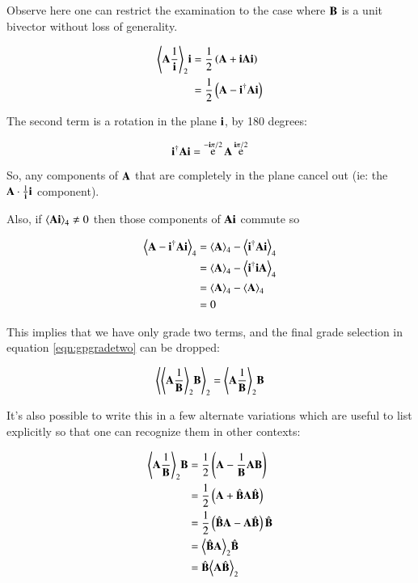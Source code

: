 \documentclass{article}      %
\DeclareMathOperator{\Exp}{e}
\newcommand{\gpgrade}[2] {{\left\langle{{#1}}\right\rangle}_{#2}}
\newcommand{\gpgradetwo}[1] {\gpgrade{#1}{2}}
\newcommand{\gpgradefour}[1] {\gpgrade{#1}{4}}
\begin{document}
Observe here one can restrict the examination to the case where $\mathbf{B}$ is a unit bivector without loss of generality.

\begin{align*}
\gpgradetwo{\BA\inv\Bi} \Bi
&= \inv{2}\left(\BA + \Bi\BA\Bi\right) \\
&= \inv{2}\left(\BA - \Bi^\dagger\BA\Bi\right) \\
\end{align*}

The second term is a rotation in the plane $\mathbf{i}$, by 180 degrees:

\[
\Bi^\dagger\BA\Bi = \Exp^{-\Bi \pi/2}\BA \Exp^{\Bi \pi/2}
\]

So, any components of $\mathbf{A}$ that are completely in the plane cancel out (ie: the $\mathbf{A} \cdot \frac{1}{\mathbf{i}}\mathbf{i}$ component).

Also, if $\gpgradefour{\BA \Bi} \ne 0$ then those components of $\mathbf{A} \mathbf{i}$ commute so

\begin{align*}
\gpgradefour{\BA - \Bi^\dagger\BA\Bi}
&= \gpgradefour{\BA} - \gpgradefour{\Bi^\dagger\BA\Bi} \\
&= \gpgradefour{\BA} - \gpgradefour{\Bi^\dagger\Bi\BA} \\
&= \gpgradefour{\BA} - \gpgradefour{\BA} \\
&= 0 \\
\end{align*}

This implies that we have only grade two terms, and the final grade selection in equation \ref{eqn:gpgradetwo} can be dropped:

\begin{equation} \label{eqn:simplergpgradetwo}
\gpgradetwo{\gpgradetwo{\BA\inv\BB} \BB} = \gpgradetwo{\BA\inv\BB} \BB
\end{equation}

It's also possible to write this in a few alternate variations which are useful to list explicitly so that one
can recognize them in other contexts:

\begin{align*}
\gpgradetwo{\BA\inv\BB} \BB
&= \inv{2}\left(\BA - \inv{\BB}\BA\BB\right)  \\
&= \inv{2}\left(\BA + \hat{\BB}\BA\hat{\BB}\right)  \\
&= \inv{2}\left( \hat{\BB}\BA -\BA\hat{\BB} \right)\hat{\BB} \\
&= \gpgradetwo{\hat{\BB}\BA}\hat{\BB} \\
&= \hat{\BB}\gpgradetwo{{\BA}\hat{\BB}} \\
\end{align*}
\end{document}
